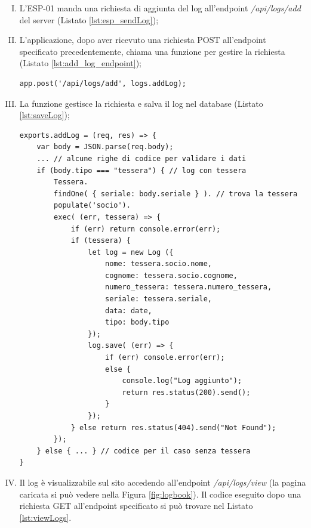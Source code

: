 \documentclass[12pt]{report}
\begin{document}
\begin{enumerate}[(I)]
	\item L'ESP-01 manda una richiesta di aggiunta del log all'endpoint \emph{/api/logs/add} del server (Listato \ref{lst:esp_sendLog});
	
	\item L'applicazione, dopo aver ricevuto una richiesta POST all'endpoint specificato precedentemente, chiama una funzione per gestire la richiesta (Listato \ref{lst:add_log_endpoint});
\begin{lstlisting}[caption={Endpoint per aggiungere i log}, label={lst:add_log_endpoint}, xleftmargin=\dimexpr-\leftmargini]
app.post('/api/logs/add', logs.addLog);
\end{lstlisting}

	\item La funzione gestisce la richiesta e salva il log nel database (Listato \ref{lst:saveLog});
\begin{lstlisting}[caption={Questa funzione aggiunge il log all'interno del database. Il corpo della richiesta POST contiene il log in formato JSON}, label={lst:saveLog}, xleftmargin=\dimexpr-\leftmargini]
exports.addLog = (req, res) => {
	var body = JSON.parse(req.body);
	... // alcune righe di codice per validare i dati
	if (body.tipo === "tessera") { // log con tessera 
		Tessera.
		findOne( { seriale: body.seriale } ). // trova la tessera 
		populate('socio').
		exec( (err, tessera) => {
			if (err) return console.error(err);
			if (tessera) {
				let log = new Log ({
					nome: tessera.socio.nome,
					cognome: tessera.socio.cognome,
					numero_tessera: tessera.numero_tessera,
					seriale: tessera.seriale,
					data: date,
					tipo: body.tipo
				});	
				log.save( (err) => {
					if (err) console.error(err);
					else {
						console.log("Log aggiunto");
						return res.status(200).send();
					}
				});
			} else return res.status(404).send("Not Found");
		});
	} else { ... } // codice per il caso senza tessera
}
\end{lstlisting}

\item Il log è visualizzabile sul sito accedendo all'endpoint \emph{/api/logs/view} (la pagina caricata si può vedere nella Figura \ref{fig:logbook})$.$ Il codice eseguito dopo una richiesta GET all'endpoint specificato si può trovare nel Listato \ref{lst:viewLogs}.


\end{enumerate}
\end{document}
